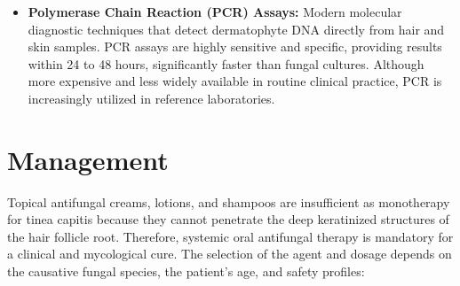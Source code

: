 \begin{itemize}
    \item \textbf{Polymerase Chain Reaction (PCR) Assays:} Modern molecular diagnostic techniques that detect dermatophyte DNA directly from hair and skin samples. PCR assays are highly sensitive and specific, providing results within 24 to 48 hours, significantly faster than fungal cultures. Although more expensive and less widely available in routine clinical practice, PCR is increasingly utilized in reference laboratories.
\end{itemize}

\section*{Management}
Topical antifungal creams, lotions, and shampoos are insufficient as monotherapy for tinea capitis because they cannot penetrate the deep keratinized structures of the hair follicle root. Therefore, systemic oral antifungal therapy is mandatory for a clinical and mycological cure. The selection of the agent and dosage depends on the causative fungal species, the patient's age, and safety profiles:
